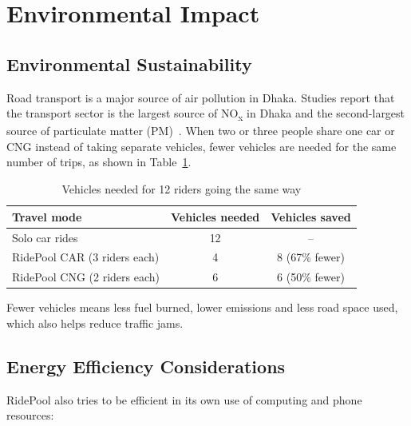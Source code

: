\section{Environmental Impact}
\label{sec:environmental-impact}

\subsection{Environmental Sustainability}

Road transport is a major source of air pollution in Dhaka. Studies report that
the transport sector is the largest source of NO\textsubscript{x} in Dhaka and
the second-largest source of particulate matter (PM)~\cite{ato_air}. When two
or three people share one car or CNG instead of taking separate vehicles, fewer
vehicles are needed for the same number of trips, as shown in
Table~\ref{tab:vehicles-saved}.

\begin{table}[H]
  \centering
  \small
  \caption{Vehicles needed for 12 riders going the same way}
  \label{tab:vehicles-saved}
  \begin{tabular}{@{}lcc@{}}
    \toprule
    \textbf{Travel mode} & \textbf{Vehicles needed} & \textbf{Vehicles saved} \\
    \midrule
    Solo car rides                & 12 & -- \\
    RidePool CAR (3 riders each)  & 4  & 8 (67\% fewer) \\
    RidePool CNG (2 riders each)  & 6  & 6 (50\% fewer) \\
    \bottomrule
  \end{tabular}
\end{table}

Fewer vehicles means less fuel burned, lower emissions and less road space
used, which also helps reduce traffic jams.

\subsection{Energy Efficiency Considerations}

RidePool also tries to be efficient in its own use of computing and phone
resources:

